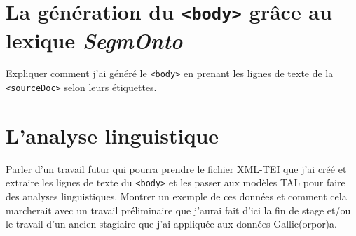\documentclass[class=article, crop=false]{standalone}
\begin{document}
\section{La génération du \texttt{<body>} grâce au lexique \textit{SegmOnto}}

Expliquer comment j'ai généré le \texttt{<body>} en prenant les lignes de texte de la \texttt{<sourceDoc>} selon leurs étiquettes.

\section{L'analyse linguistique}

Parler d'un travail futur qui pourra prendre le fichier XML-TEI que j'ai créé et extraire les lignes de texte du \texttt{<body>} et les passer aux modèles TAL pour faire des analyses linguistiques. Montrer un exemple de ces données et comment cela marcherait avec un travail préliminaire que j'aurai fait d'ici la fin de stage et/ou le travail d'un ancien stagiaire que j'ai appliquée aux données Gallic(orpor)a. 
\end{document}
